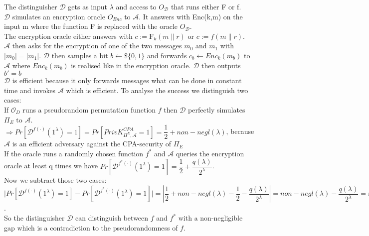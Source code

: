 The distinguisher $\mathcal{D}$ gets as input $\lambda $ and access to $O_{\mathcal{D}}$ that runs either F or f.\\

$\mathcal{D}$ simulates an encryption oracle $O_{Enc}$ to $\mathcal{A}$. It answers with Enc(k,m) on the input m where the function F is replaced with the oracle $O_{\mathcal{D}}$.\\

The encryption oracle either answers with $c := \mathrm{F}_{k}(m \parallel r)$ or  $c := f(m \parallel r)$.\\

\(\mathcal{A}\) then asks for the encryption of one of the two messages \(m_0\) and \(m_1\) with \(\vert m_0 \vert = \vert m_1 \vert \). 
\(\mathcal{D}\) then samples a bit \(b \leftarrow\$ \{0,1\}\) and forwards \(c_b \leftarrow Enc_k(m_b)\) to \(\mathcal{A}\) where \(Enc_k(m_b)\) is realised like in the encryption oracle. 
\(\mathcal{D}\) then outputs $b' = b$ \\

\(\mathcal{D}\) is efficient because it only forwards messages what can be done in constant time and invokes \(\mathcal{A}\) which is efficient.
To analyse the success we distinguish two cases:\\

If \(\mathcal{O}_{D}\) runs a pseudorandom permutation function \(f\) then \(\mathcal{D}\) perfectly simulates \(\Pi_{E}\) to \(\mathcal{A}\). \\

\(\Rightarrow Pr[\mathcal{D}^{f(\cdot)}(1^\lambda) = 1] = Pr[PrivK^{CPA}_{\Pi^{E},\mathcal{A}} = 1] = \dfrac{1}{2} + non-negl(\lambda)\), because \(\mathcal{A}\) is an efficient adversary against the CPA-security of \(\Pi_{E}\)\\

If the oracle runs a randomly chosen function \(f^*\) and \(\mathcal{A}\) queries the encryption oracle at least q times we have \(Pr[\mathcal{D}^{f^*(\cdot)}(1^\lambda) = 1] = \dfrac{1}{2} + \dfrac{q(\lambda)}{2^\lambda}\).\\
Now we subtract those two cases:\\

\(\vert Pr[\mathcal{D}^{f(\cdot)}(1^\lambda) = 1] - Pr[\mathcal{D}^{f^*(\cdot)}(1^\lambda) = 1] \vert = \left\vert \dfrac{1}{2} + non-negl(\lambda) - \dfrac{1}{2} - \dfrac{q(\lambda)}{2^\lambda} \right\vert = non-negl(\lambda) - \dfrac{q(\lambda)}{2^\lambda} = non-negl(\lambda) \).\\
 So the distinguisher \(\mathcal{D}\) can distinguish between \(f\) and \(f^*\) with a non-negligible gap which is a contradiction to the pseudorandomness of \(f\).\\

